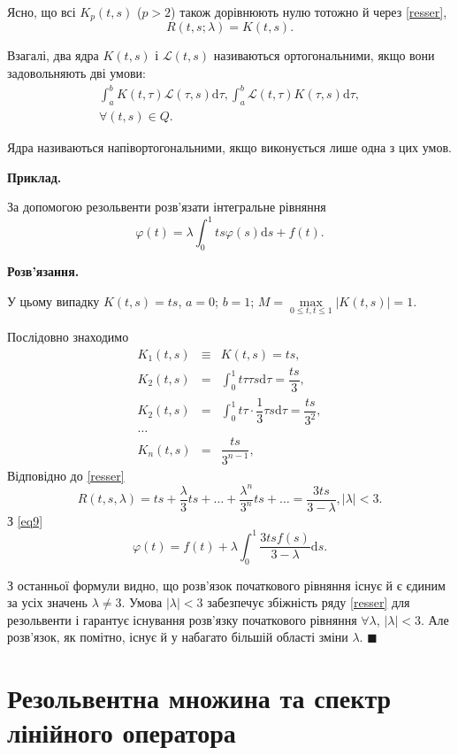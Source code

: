 \documentclass[14pt,twoside]{extreport}
\theoremstyle{mystyle}
\numberwithin{equation}{chapter}
\begin{document}
Ясно, що всі $K_p(t, s)$ ($p > 2$) також дорівнюють нулю тотожно й через \eqref{resser},
\[
R(t, s; \lambda) = K(t, s).
\]

Взагалі, два ядра $K(t, s)$ і $\mathscr{L}(t, s)$ називаються ортогональними, якщо вони задовольняють дві умови:
\[
 \begin{array}{c}
  \displaystyle\int_{a}^{b} K(t, \tau) \mathscr{L}(\tau, s) \mathrm{d} \tau, \int_{a}^{b} \mathscr{L}(t, \tau) K(\tau, s) \mathrm{d} \tau,\\
  \forall (t,s) \in Q.
 \end{array}
\]

Ядра називаються напівортогональними, якщо виконується лише одна з цих умов.

\textbf{Приклад.}

За допомогою резольвенти розв'язати інтегральне рівняння
\[
\varphi(t) = \lambda \int_{0}^{1} ts \varphi(s) \mathrm{d}s + f(t).
\]

\textbf{Розв'язання.}

У цьому випадку $K(t, s) =ts$, $a=0$; $b=1$; $M=\max\limits_{0\leqslant t, t \leqslant 1} |K(t, s)| =1$.

Послідовно знаходимо
\[
\begin{array}{lll}
 K_1(t, s) &\equiv& K(t, s) = ts,\\
 K_2(t, s) &=& \displaystyle\int_0^1 t\tau\tau s\mathrm{d}\tau = \dfrac{ts}{3},\\
 K_2(t, s) &=& \displaystyle\int_0^1 t\tau\cdot\dfrac{1}{3}\tau s\mathrm{d}\tau = \dfrac{ts}{3^2},\\
 \dots\\
 K_n(t, s) &=& \dfrac{ts}{3^{n-1}},
\end{array}
\]
Відповідно до \eqref{resser}
\[
 R(t, s, \lambda) = ts + \frac{\lambda}{3}ts+ \ldots + \frac{\lambda^n}{3^n}ts + \ldots = \dfrac{3ts}{3-\lambda}, |\lambda|<3.
\]
З \eqref{eq9}
\[
 \varphi(t)=f(t) + \lambda \int_{0}^{1}\dfrac{3tsf(s)}{3-\lambda} \mathrm{d}s.
\]

З останньої формули видно, що розв'язок початкового рівняння існує й є єдиним за усіх значень $\lambda \neq 3$. Умова $|\lambda|<3$ забезпечує збіжність ряду \eqref{resser} для резольвенти і гарантує існування розв'язку початкового рівняння $\forall\lambda$, $|\lambda|<3$. Але розв'язок, як помітно, існує й у набагато більшій області зміни $\lambda$. $\blacksquare$

\section{Резольвентна множина та спектр лінійного оператора}
\end{document}

